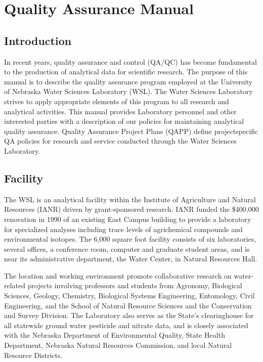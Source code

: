 \chapter{Quality Assurance Manual}
\section{Introduction}
In recent years, quality assurance and control (QA/QC) has become 
fundamental to the production of analytical data for scientific 
research. The purpose of this manual is to describe the quality 
assurance program employed at the University of Nebraska Water Sciences 
Laboratory (WSL). The Water Sciences Laboratory strives to apply 
appropriate elements of this program to all research and analytical 
activities. This manual provides Laboratory personnel and other 
interested parties with a description of our policies for maintaining 
analytical quality assurance. Quality Assurance Project Plans (QAPP) 
define projectspecific QA policies for research and service conducted 
through the Water Sciences Laboratory.



\section{Facility}
The WSL is an analytical facility within the Institute of Agriculture 
and Natural Resources (IANR) driven by grant-sponsored research. IANR 
funded the \$400,000 renovation in 1990 of an existing 
East Campus building to provide a laboratory for specialized analyses 
including trace levels of agrichemical compounds and environmental 
isotopes. The 6,000 square foot facility consists of six laboratories, 
several offices, a conference room, computer and graduate student areas, 
and is near its administrative department, the Water Center, in Natural 
Resources Hall. 

The location and working environment promote collaborative research on 
water-related projects involving professors and students from Agronomy, 
Biological Sciences, Geology, Chemistry, Biological Systems Engineering, 
Entomology, Civil Engineering, and the School of Natural Resource 
Sciences and the Conservation and Survey Division. The Laboratory also 
serves as the State's clearinghouse for all statewide ground water 
pesticide and nitrate data, and is closely associated with the Nebraska 
Department of Environmental Quality, State Health Department, Nebraska 
Natural Resources Commission, and local Natural Resource Districts.



